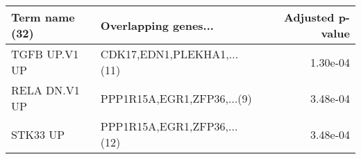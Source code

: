 \begin{tabular}{llr}
\toprule
Term name (32) &        Overlapping genes... &  Adjusted p-value \\
\midrule
 TGFB UP.V1 UP &  CDK17,EDN1,PLEKHA1,...(11) &          1.30e-04 \\
 RELA DN.V1 UP &  PPP1R15A,EGR1,ZFP36,...(9) &          3.48e-04 \\
      STK33 UP & PPP1R15A,EGR1,ZFP36,...(12) &          3.48e-04 \\
\bottomrule
\end{tabular}
